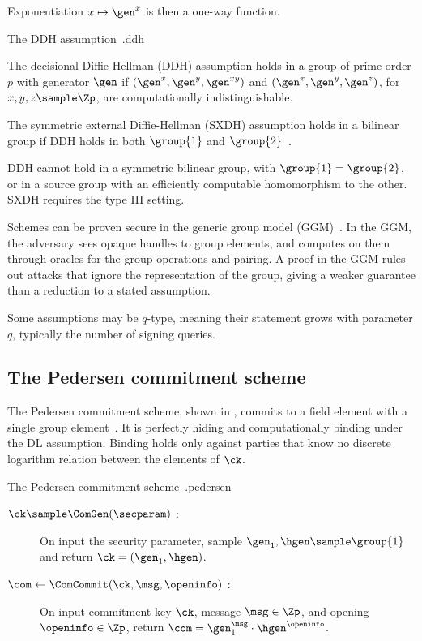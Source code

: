 Exponentiation $x \mapsto \gen^x$ is then a one-way function.

\begin{assumptionbox}{The DDH assumption~\cite{Boneh98}.}{ddh}

  The decisional Diffie-Hellman (DDH) assumption holds in a group of prime order $p$ with generator $\gen$
if $(\gen^x, \gen^y, \gen^{xy})$ and $(\gen^x, \gen^y, \gen^z)$, for $x, y, z
\sample \Zp$, are computationally indistinguishable.

\end{assumptionbox}

The symmetric external Diffie-Hellman (SXDH) assumption holds in a bilinear group
if DDH holds in both $\group{1}$ and
$\group{2}$~\cite{EC:GroSah08}.

DDH cannot hold in a symmetric bilinear group, with $\group{1} = \group{2}$, or
in a source group with an efficiently computable homomorphism to the other. SXDH
requires the type III setting.

Schemes can be proven secure in the generic group model
(GGM)~\cite{EC:Shoup97,IMA:Maurer05}. In the GGM, the adversary sees
opaque handles to group elements, and computes on them through oracles for
the group operations and pairing. A proof in the GGM rules out attacks that
ignore the representation of the group, giving a weaker guarantee than a
reduction to a stated assumption.

Some assumptions may be $q$-type, meaning their
statement grows with parameter $q$, typically the number of signing queries.

\subsection{The Pedersen commitment scheme}

The Pedersen commitment scheme, shown in , commits to a field
element with a single group element~\cite{C:Pedersen91}. It is perfectly hiding
and computationally binding under the DL assumption. Binding holds only against
parties that know no discrete logarithm relation between the elements of $\ck$.

\begin{primitivebox}{The Pedersen commitment scheme~\cite{C:Pedersen91}.}{pedersen}

  \begin{description}

    \item[$\ck \sample \ComGen(\secparam)$ :] On input the security parameter,
sample $\gen_1, \hgen \sample \group{1}$ and return $\ck = (\gen_1, \hgen)$.

    \item[$\com \leftarrow \ComCommit(\ck,\msg,\openinfo)$ :] On input
commitment key $\ck$, message $\msg \in \Zp$, and opening $\openinfo \in \Zp$,
return $\com = \gen_1^{\msg}\cdot\hgen^{\openinfo}$.

  \end{description}

\end{primitivebox}

